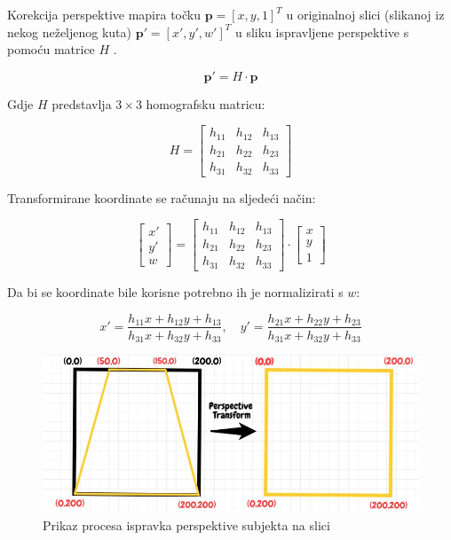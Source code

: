 \documentclass{foi}
\begin{document}
Korekcija perspektive mapira točku \( \mathbf{p} = [x, y, 1]^T \) u originalnoj slici (slikanoj iz nekog neželjenog kuta) \( \mathbf{p'} = [x', y', w']^T \) u sliku ispravljene perspektive s pomoću matrice \( H \) \cite{OpenCvPerpsective}.

\[
\mathbf{p'} = H \cdot \mathbf{p}
\]

Gdje \( H \) predstavlja \( 3 \times 3 \) homografsku matricu:

\[
H = 
\begin{bmatrix}
h_{11} & h_{12} & h_{13} \\
h_{21} & h_{22} & h_{23} \\
h_{31} & h_{32} & h_{33}
\end{bmatrix}
\]

Transformirane koordinate se računaju na sljedeći način:

\[
\begin{bmatrix}
x' \\
y' \\
w
\end{bmatrix}
=
\begin{bmatrix}
h_{11} & h_{12} & h_{13} \\
h_{21} & h_{22} & h_{23} \\
h_{31} & h_{32} & h_{33}
\end{bmatrix}
\cdot
\begin{bmatrix}
x \\
y \\
1
\end{bmatrix}
\]

Da bi se koordinate bile korisne potrebno ih je normalizirati s \( w \):

\[
x' = \frac{h_{11}x + h_{12}y + h_{13}}{h_{31}x + h_{32}y + h_{33}}, \quad
y' = \frac{h_{21}x + h_{22}y + h_{23}}{h_{31}x + h_{32}y + h_{33}}
\]

\begin{figure}[H]
    \centering
    \includegraphics[width=0.85\linewidth]{slike/perspective.png}
    \caption{Prikaz procesa ispravka perspektive subjekta na slici \cite{OpenCvPerpsective}}
\end{figure}
\end{document}
